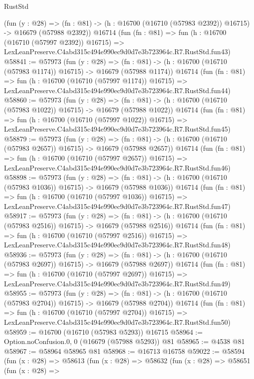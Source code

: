 \begin{lexlean}{RustStd}
\begin{coremodule}
    (fun (y : @28) =>
    (fn : @81) -> (h : @16700 (@16710 (@57983 @2392)) @16715) -> @16679 (@57988 @2392))
    @16714
    (fun (fn : @81) =>
    fun (h : @16700 (@16710 (@57997 @2392)) @16715) =>
    LexLeanPreserve.C4abd315c494e990ec9d0d7e3b723964c.R7.RustStd.fun43)
@58841 := @57973
    (fun (y : @28) =>
    (fn : @81) -> (h : @16700 (@16710 (@57983 @1174)) @16715) -> @16679 (@57988 @1174))
    @16714
    (fun (fn : @81) =>
    fun (h : @16700 (@16710 (@57997 @1174)) @16715) =>
    LexLeanPreserve.C4abd315c494e990ec9d0d7e3b723964c.R7.RustStd.fun44)
@58860 := @57973
    (fun (y : @28) =>
    (fn : @81) -> (h : @16700 (@16710 (@57983 @1022)) @16715) -> @16679 (@57988 @1022))
    @16714
    (fun (fn : @81) =>
    fun (h : @16700 (@16710 (@57997 @1022)) @16715) =>
    LexLeanPreserve.C4abd315c494e990ec9d0d7e3b723964c.R7.RustStd.fun45)
@58879 := @57973
    (fun (y : @28) =>
    (fn : @81) -> (h : @16700 (@16710 (@57983 @2657)) @16715) -> @16679 (@57988 @2657))
    @16714
    (fun (fn : @81) =>
    fun (h : @16700 (@16710 (@57997 @2657)) @16715) =>
    LexLeanPreserve.C4abd315c494e990ec9d0d7e3b723964c.R7.RustStd.fun46)
@58898 := @57973
    (fun (y : @28) =>
    (fn : @81) -> (h : @16700 (@16710 (@57983 @1036)) @16715) -> @16679 (@57988 @1036))
    @16714
    (fun (fn : @81) =>
    fun (h : @16700 (@16710 (@57997 @1036)) @16715) =>
    LexLeanPreserve.C4abd315c494e990ec9d0d7e3b723964c.R7.RustStd.fun47)
@58917 := @57973
    (fun (y : @28) =>
    (fn : @81) -> (h : @16700 (@16710 (@57983 @2516)) @16715) -> @16679 (@57988 @2516))
    @16714
    (fun (fn : @81) =>
    fun (h : @16700 (@16710 (@57997 @2516)) @16715) =>
    LexLeanPreserve.C4abd315c494e990ec9d0d7e3b723964c.R7.RustStd.fun48)
@58936 := @57973
    (fun (y : @28) =>
    (fn : @81) -> (h : @16700 (@16710 (@57983 @2697)) @16715) -> @16679 (@57988 @2697))
    @16714
    (fun (fn : @81) =>
    fun (h : @16700 (@16710 (@57997 @2697)) @16715) =>
    LexLeanPreserve.C4abd315c494e990ec9d0d7e3b723964c.R7.RustStd.fun49)
@58955 := @57973
    (fun (y : @28) =>
    (fn : @81) -> (h : @16700 (@16710 (@57983 @2704)) @16715) -> @16679 (@57988 @2704))
    @16714
    (fun (fn : @81) =>
    fun (h : @16700 (@16710 (@57997 @2704)) @16715) =>
    LexLeanPreserve.C4abd315c494e990ec9d0d7e3b723964c.R7.RustStd.fun50)
@58959 := @16700 (@16710 (@57983 @5293)) @16715
@58964 := Option.noConfusion.{0, 0} (@16679 (@57988 @5293)) @81
@58965 := @4538 @81
@58967 := @58964 @58965 @81
@58968 := @16713 @16758
@59022 := @58594
    (fun (x : @28) =>
    @58613
      (fun (x : @28) =>
      @58632
        (fun (x : @28) =>
        @58651
          (fun (x : @28) =>

\end{coremodule}
\end{lexlean}
